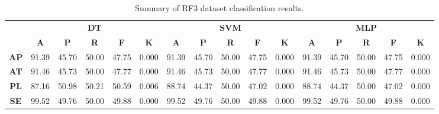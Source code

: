 \begin{landscape}
\begin{table}[htbp]
\footnotesize
\centering
\caption{Summary of RF3 dataset classification results.}
\label{tab:base_female}
\begin{tabular}{|c|c|c|c|c|c|c|c|c|c|c|c|c|c|c|c|}
\hline
\multirow{2}{*}{}	& \multicolumn{5}{c|}{\textbf{DT}}												& \multicolumn{5}{c|}{\textbf{SVM}}												& \multicolumn{5}{c|}{\textbf{MLP}}												\\ \cline{2-16} 
					& \textbf{A}	& \textbf{P}	& \textbf{R}	& \textbf{F}	& \textbf{K}	& \textbf{A}	& \textbf{P}	& \textbf{R}	& \textbf{F}	& \textbf{K}	& \textbf{A}	& \textbf{P}	& \textbf{R}	& \textbf{F}	& \textbf{K}	\\ \hline
\textbf{AP}			& 91.39			& 45.70			& 50.00			& 47.75			& 0.000			& 91.39			& 45.70			& 50.00			& 47.75			& 0.000			& 91.39			& 45.70			& 50.00			& 47.75			& 0.000			\\ \hline
\textbf{AT}			& 91.46			& 45.73			& 50.00			& 47.77			& 0.000			& 91.46			& 45.73			& 50.00			& 47.77			& 0.000			& 91.46			& 45.73			& 50.00			& 47.77			& 0.000			\\ \hline
\textbf{PL}			& 87.16			& 50.98			& 50.21			& 50.59			& 0.006			& 88.74			& 44.37			& 50.00			& 47.02			& 0.000			& 88.74			& 44.37			& 50.00			& 47.02			& 0.000			\\ \hline
\textbf{SE}			& 99.52			& 49.76			& 50.00			& 49.88			& 0.000			& 99.52			& 49.76			& 50.00			& 49.88			& 0.000			& 99.52			& 49.76			& 50.00			& 49.88			& 0.000			\\ \hline
\end{tabular}
\end{table}
\end{landscape}